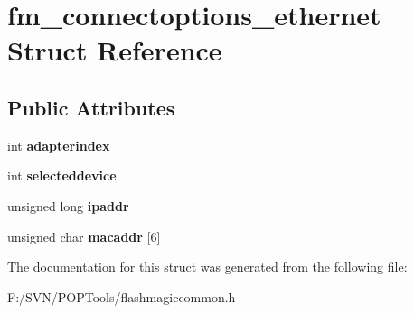 \hypertarget{structfm__connectoptions__ethernet}{\section{fm\-\_\-connectoptions\-\_\-ethernet Struct Reference}
\label{structfm__connectoptions__ethernet}
}
\subsection*{Public Attributes}
\begin{DoxyCompactItemize}
\item 
\hypertarget{structfm__connectoptions__ethernet_ab6b5ac437af297d4473f720d197b88cc}{int {\bfseries adapterindex}}\label{structfm__connectoptions__ethernet_ab6b5ac437af297d4473f720d197b88cc}

\item 
\hypertarget{structfm__connectoptions__ethernet_a2fc154e52da6b39c0d1db0fcbc129c9f}{int {\bfseries selecteddevice}}\label{structfm__connectoptions__ethernet_a2fc154e52da6b39c0d1db0fcbc129c9f}

\item 
\hypertarget{structfm__connectoptions__ethernet_a292fb237173feb3ea06101ba2cd076ba}{unsigned long {\bfseries ipaddr}}\label{structfm__connectoptions__ethernet_a292fb237173feb3ea06101ba2cd076ba}

\item 
\hypertarget{structfm__connectoptions__ethernet_a8af0ac17e22a2833460bbcffe5a0c868}{unsigned char {\bfseries macaddr} \mbox{[}6\mbox{]}}\label{structfm__connectoptions__ethernet_a8af0ac17e22a2833460bbcffe5a0c868}

\end{DoxyCompactItemize}


The documentation for this struct was generated from the following file\-:\begin{DoxyCompactItemize}
\item 
F\-:/\-S\-V\-N/\-P\-O\-P\-Tools/flashmagiccommon.\-h\end{DoxyCompactItemize}
